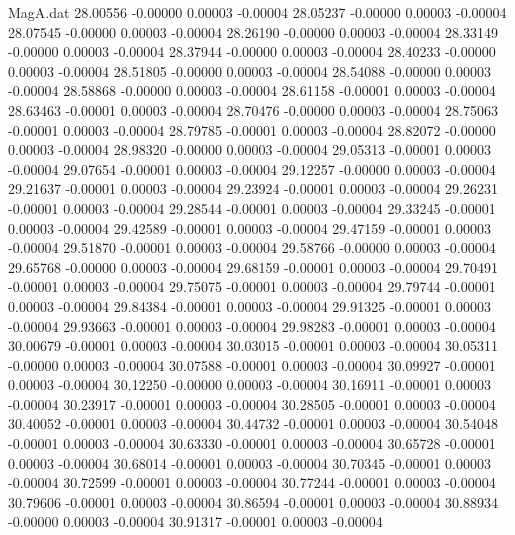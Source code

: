 \begin{filecontents}{MagA.dat}
  28.00556   -0.00000    0.00003   -0.00004
  28.05237   -0.00000    0.00003   -0.00004
  28.07545   -0.00000    0.00003   -0.00004
  28.26190   -0.00000    0.00003   -0.00004
  28.33149   -0.00000    0.00003   -0.00004
  28.37944   -0.00000    0.00003   -0.00004
  28.40233   -0.00000    0.00003   -0.00004
  28.51805   -0.00000    0.00003   -0.00004
  28.54088   -0.00000    0.00003   -0.00004
  28.58868   -0.00000    0.00003   -0.00004
  28.61158   -0.00001    0.00003   -0.00004
  28.63463   -0.00001    0.00003   -0.00004
  28.70476   -0.00000    0.00003   -0.00004
  28.75063   -0.00001    0.00003   -0.00004
  28.79785   -0.00001    0.00003   -0.00004
  28.82072   -0.00000    0.00003   -0.00004
  28.98320   -0.00000    0.00003   -0.00004
  29.05313   -0.00001    0.00003   -0.00004
  29.07654   -0.00001    0.00003   -0.00004
  29.12257   -0.00000    0.00003   -0.00004
  29.21637   -0.00001    0.00003   -0.00004
  29.23924   -0.00001    0.00003   -0.00004
  29.26231   -0.00001    0.00003   -0.00004
  29.28544   -0.00001    0.00003   -0.00004
  29.33245   -0.00001    0.00003   -0.00004
  29.42589   -0.00001    0.00003   -0.00004
  29.47159   -0.00001    0.00003   -0.00004
  29.51870   -0.00001    0.00003   -0.00004
  29.58766   -0.00000    0.00003   -0.00004
  29.65768   -0.00000    0.00003   -0.00004
  29.68159   -0.00001    0.00003   -0.00004
  29.70491   -0.00001    0.00003   -0.00004
  29.75075   -0.00001    0.00003   -0.00004
  29.79744   -0.00001    0.00003   -0.00004
  29.84384   -0.00001    0.00003   -0.00004
  29.91325   -0.00001    0.00003   -0.00004
  29.93663   -0.00001    0.00003   -0.00004
  29.98283   -0.00001    0.00003   -0.00004
  30.00679   -0.00001    0.00003   -0.00004
  30.03015   -0.00001    0.00003   -0.00004
  30.05311   -0.00000    0.00003   -0.00004
  30.07588   -0.00001    0.00003   -0.00004
  30.09927   -0.00001    0.00003   -0.00004
  30.12250   -0.00000    0.00003   -0.00004
  30.16911   -0.00001    0.00003   -0.00004
  30.23917   -0.00001    0.00003   -0.00004
  30.28505   -0.00001    0.00003   -0.00004
  30.40052   -0.00001    0.00003   -0.00004
  30.44732   -0.00001    0.00003   -0.00004
  30.54048   -0.00001    0.00003   -0.00004
  30.63330   -0.00001    0.00003   -0.00004
  30.65728   -0.00001    0.00003   -0.00004
  30.68014   -0.00001    0.00003   -0.00004
  30.70345   -0.00001    0.00003   -0.00004
  30.72599   -0.00001    0.00003   -0.00004
  30.77244   -0.00001    0.00003   -0.00004
  30.79606   -0.00001    0.00003   -0.00004
  30.86594   -0.00001    0.00003   -0.00004
  30.88934   -0.00000    0.00003   -0.00004
  30.91317   -0.00001    0.00003   -0.00004

\end{filecontents}

